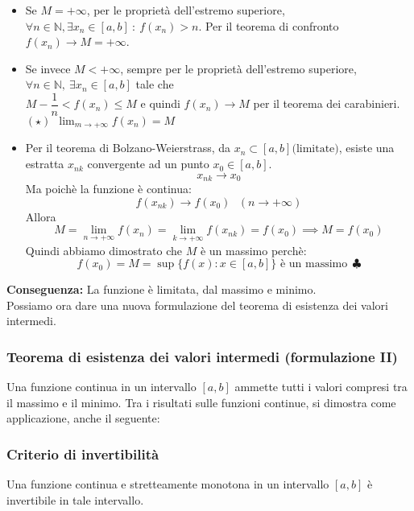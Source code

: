 \documentclass[../../main.tex]{subfiles}
\begin{document}
\begin{itemize}
    \item Se $M = +\infty$, per le proprietà dell'estremo superiore, $\forall n\in
              \mathbb{N}, \exists x_n\in[a, b] \ : \ f(x_n) > n$. Per il teorema di confronto
          $f(x_n) \to M = +\infty$.
    \item Se invece $M < +\infty$, sempre per le proprietà dell'estremo superiore,
          $\forall n\in \mathbb{N}, \ \exists x_n\in[a,b]$ tale che \\ $M - \dfrac{1}{n}
              < f(x_n) \leq M$ e quindi $f(x_n) \to M$ per il teorema dei carabinieri.
          $(\star) \ \ \lim_{m\to+\infty} f(x_n) = M$
    \item Per il teorema di Bolzano-Weierstrass, da $x_n \subset [a, b] \text{
                  (limitate)}$, esiste una estratta $x_{nk}$ convergente ad un punto $x_0\in[a,
                  b]$.
          \[
              x_{nk} \to x_0
          \]
          Ma poichè la funzione è continua:
          \[
              f(x_{nk}) \to f(x_0) \ \ \ (n \to +\infty)
          \]
          Allora
          \[
              M = \lim_{n\to+\infty} f(x_n) = \lim_{k\to+\infty} f(x_{nk}) = f(x_0) \implies M = f(x_0)
          \]
          Quindi abbiamo dimostrato che $M$ è un massimo perchè:
          \[
              f(x_0) = M = \sup \{f(x) : x\in[a, b]\} \text{ è un massimo} \ \ \clubsuit
          \]
\end{itemize}
\textbf{Conseguenza:} La funzione è limitata, dal massimo e minimo.\\

Possiamo ora dare una nuova formulazione del teorema di esistenza dei valori
intermedi.

\subsubsection{Teorema di esistenza dei valori intermedi (formulazione II)}
Una funzione continua in un intervallo $[a,b]$ ammette tutti i valori compresi
tra il massimo e il minimo. Tra i risultati sulle funzioni continue, si
dimostra come applicazione, anche il seguente:
\subsubsection{Criterio di invertibilità}
Una funzione continua e stretteamente monotona in un intervallo $[a ,b]$ è
invertibile in tale intervallo.
\end{document}
